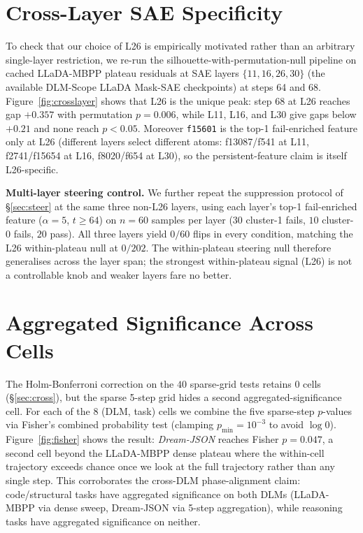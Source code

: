 \documentclass[11pt]{article}
\begin{document}
\section{Cross-Layer SAE Specificity}
\label{sec:appendix_crosslayer}

To check that our choice of L26 is empirically motivated rather than an arbitrary single-layer restriction, we re-run the silhouette-with-permutation-null pipeline on cached LLaDA-MBPP plateau residuals at SAE layers $\{11, 16, 26, 30\}$ (the available DLM-Scope LLaDA Mask-SAE checkpoints) at steps 64 and 68.
Figure~\ref{fig:crosslayer} shows that L26 is the unique peak: step 68 at L26 reaches gap $+0.357$ with permutation $p=0.006$, while L11, L16, and L30 give gaps below $+0.21$ and none reach $p\!<\!0.05$.
Moreover \texttt{f15601} is the top-1 fail-enriched feature only at L26 (different layers select different atoms: f13087/f541 at L11, f2741/f15654 at L16, f8020/f654 at L30), so the persistent-feature claim is itself L26-specific.

\textbf{Multi-layer steering control.}
We further repeat the suppression protocol of \S\ref{sec:steer} at the same three non-L26 layers, using each layer's top-1 fail-enriched feature ($\alpha\!=\!5$, $t\!\ge\!64$) on $n\!=\!60$ samples per layer ($30$ cluster-1 fails, $10$ cluster-0 fails, $20$ pass).
All three layers yield $0/60$ flips in every condition, matching the L26 within-plateau null at $0/202$.
The within-plateau steering null therefore generalises across the layer span; the strongest within-plateau signal (L26) is not a controllable knob and weaker layers fare no better.

\section{Aggregated Significance Across Cells}
\label{sec:appendix_fisher}

The Holm-Bonferroni correction on the $40$ sparse-grid tests retains $0$ cells (\S\ref{sec:cross}), but the sparse 5-step grid hides a second aggregated-significance cell.
For each of the $8$ (DLM, task) cells we combine the five sparse-step $p$-values via Fisher's combined probability test (clamping $p_{\min}\!=\!10^{-3}$ to avoid $\log 0$).
Figure~\ref{fig:fisher} shows the result: \emph{Dream-JSON} reaches Fisher $p=0.047$, a second cell beyond the LLaDA-MBPP dense plateau where the within-cell trajectory exceeds chance once we look at the full trajectory rather than any single step.
This corroborates the cross-DLM phase-alignment claim: code/structural tasks have aggregated significance on both DLMs (LLaDA-MBPP via dense sweep, Dream-JSON via 5-step aggregation), while reasoning tasks have aggregated significance on neither.
\end{document}
